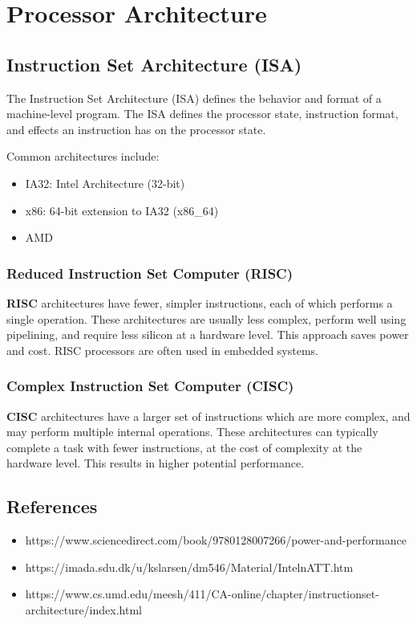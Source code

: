 \chapter{Processor Architecture}

\section{Instruction Set Architecture (ISA)}

The Instruction Set Architecture (ISA) defines the behavior and format of a machine-level program. The ISA defines the processor state, instruction format, and effects an instruction has on the processor state. 

Common architectures include:
\begin{itemize}
	\item IA32: Intel Architecture (32-bit)
	\item x86: 64-bit extension to IA32 (x86\_64)
	\item AMD
\end{itemize}

\subsection{Reduced Instruction Set Computer (RISC)}

\textbf{RISC} architectures have fewer, simpler instructions, each of which performs a single operation. These architectures are usually less complex, perform well using pipelining, and require less silicon at a hardware level. This approach saves power and cost. RISC processors are often used in embedded systems.

\subsection{Complex Instruction Set Computer (CISC)}

\textbf{CISC} architectures have a larger set of instructions which are more complex, and may perform multiple internal operations. These architectures can typically complete a task with fewer instructions, at the cost of complexity at the hardware level. This results in higher potential performance.

\section{References}

\begin{itemize}
	\item https://www.sciencedirect.com/book/9780128007266/power-and-performance
	\item https://imada.sdu.dk/u/kslarsen/dm546/Material/IntelnATT.htm
	\item https://www.cs.umd.edu/meesh/411/CA-online/chapter/instructionset-
	architecture/index.html
\end{itemize}